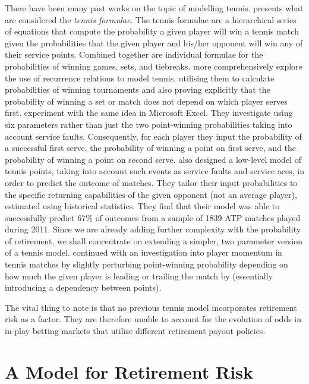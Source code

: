 \documentclass[letterpaper,12pt]{article}
\begin{document}
There have been many past works on the topic of modelling tennis.  \cite{omalley} presents what are considered the \textit{tennis formulae}.  The tennis formulae are a hierarchical series of equations that compute the probability a given player will win a tennis match given the probabilities that the given player and his/her opponent will win any of their service points.  Combined together are individual formulae for the probabilities of winning games, sets, and tiebreaks.  
\cite{servefirst} more comprehensively explore the use of recurrence relations to model tennis, utilising them to calculate probabilities of winning tournaments and also proving explicitly that the probability of winning a set or match does not depend on which player serves first.  \cite{excel} experiment with the same idea in Microsoft Excel.  They investigate using six parameters rather than just the two point-winning probabilities taking into account service faults.  Consequently, for each player they input the probability of a successful first serve, the probability of winning a point on first serve, and the probability of winning a point on second serve.  \cite{willyk} also designed a low-level model of tennis points, taking into account such events as service faults and service aces, in order to predict the outcome of matches.  They tailor their input probabilities to the specific returning capabilities of the given opponent (not an average player), estimated using historical statistics.  They find that their model was able to successfully predict 67\% of outcomes from a sample of 1839 ATP matches played during 2011.  Since we are already adding further complexity with the probability of retirement, we shall concentrate on extending a simpler, two parameter version of a tennis model.  \cite{momentum} continued with an investigation into player momentum in tennis matches by slightly perturbing point-winning probability depending on how much the given player is leading or trailing the match by (essentially introducing a dependency between points).

The vital thing to note is that no previous tennis model incorporates retirement risk as a factor.  They are therefore unable to account for the evolution of odds in in-play betting markets that utilise different retirement payout policies.

\newpage

\section{A Model for Retirement Risk}
\end{document}
